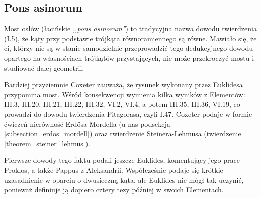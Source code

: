 %

\subsection{Pons asinorum}
Most osłów (łacińskie \emph{,,pons asinorum''}) to tradycyjna nazwa dowodu twierdzenia (I.5), że kąty przy podstawie trójkąta równoramiennego są równe.
Mawiało się, że ci, którzy nie są w stanie samodzielnie przeprowadzić tego dedukcyjnego dowodu opartego na własnościach trójkątów przystających, nie może przekroczyć mostu i studiować dalej geometrii.

Bardziej przyziemnie Coxeter \cite[s. 6-9]{coxeter_1991} zauważa, że rysunek wykonany przez Euklidesa przypomina most.
Wśród konsekwencji wymienia kilka wyników z Elementów: III.3, III.20, III.21, III.22, III.32, VI.2, VI.4, a potem III.35, III.36, VI.19, co prowadzi do dowodu twierdzenia Pitagorasa, czyli I.47. %
%
Coxeter podaje w formie ćwiczeń nierówność Erdősa-Mordella (u nas podsekcja \ref{subsection_erdos_mordell}) oraz twierdzenie Steinera-Lehmusa (twierdzenie \ref{theorem_steiner_lehmus}).
%
%

Pierwsze dowody tego faktu podali jeszcze Euklides, komentujący jego prace Proklos, a także Pappus z Aleksandrii.
%
%
Współcześnie podaje się krótkie uzasadnienie w oparciu o dwusieczną kąta, ale Euklides nie mógł tak uczynić, ponieważ definiuje ją dopiero cztery tezy później w swoich Elementach.


%